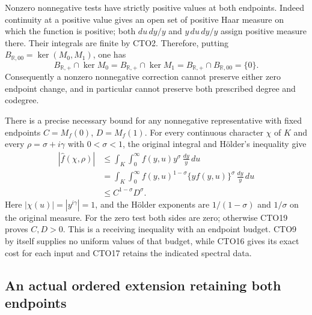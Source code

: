 Nonzero nonnegative tests have strictly positive values at both
endpoints. Indeed continuity at a positive value gives an open
set of positive Haar measure on which the function is positive;
both $du\,dy/y$ and $y\,du\,dy/y$ assign positive measure there.
Their integrals are finite by CTO2. Therefore, putting
$B_{\mathbb R,00}=\ker(M_0,M_1)$, one has
\begin{equation}\tag{CTO19}
B_{\mathbb R,+}\cap\ker M_0
=B_{\mathbb R,+}\cap\ker M_1
=B_{\mathbb R,+}\cap B_{\mathbb R,00}=\{0\}.
\end{equation}
Consequently a nonzero nonnegative correction cannot preserve
either zero endpoint change, and in particular cannot preserve
both prescribed degree and codegree.

There is a precise necessary bound for any nonnegative
representative with fixed endpoints $C=M_f(0)$, $D=M_f(1)$.
For every continuous character $\chi$ of $K$ and every
$\rho=\sigma+i\gamma$ with $0<\sigma<1$, the original integral
and H\"older's inequality give
\begin{equation}\tag{CTO20}
\begin{split}
|\widehat f(\chi,\rho)|
&\le\int_K\int_0^\infty f(y,u)y^\sigma\,\frac{dy}{y}\,du\\
&=\int_K\int_0^\infty
       f(y,u)^{1-\sigma}\{yf(y,u)\}^{\sigma}
                                          \,\frac{dy}{y}\,du\\
&\le C^{1-\sigma}D^\sigma.
\end{split}
\end{equation}
Here $|\chi(u)|=|y^{i\gamma}|=1$, and the H\"older exponents
are $1/(1-\sigma)$ and $1/\sigma$ on the original measure.
For the zero test both sides are zero; otherwise CTO19 proves
$C,D>0$. This is a receiving inequality with an endpoint budget.
CTO9 by itself supplies no uniform values of that budget, while
CTO16 gives its exact cost for each input and CTO17 retains
the indicated spectral data.

\subsection{An actual ordered extension retaining both endpoints}

